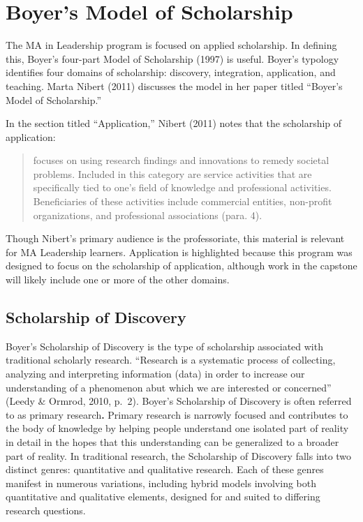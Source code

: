 \documentclass[
  letterpaper,
  DIV=11,
  numbers=noendperiod]{scrreprt}
\begin{document}
\section*{Boyer's Model of
Scholarship}\label{boyers-model-of-scholarship}


The MA in Leadership program is focused on applied scholarship. In
defining this, Boyer's four-part Model of Scholarship (1997) is useful.
Boyer's typology identifies four domains of scholarship: discovery,
integration, application, and teaching. Marta Nibert (2011) discusses
the model in her paper titled ``Boyer's Model of Scholarship.''

In the section titled ``Application,'' Nibert (2011) notes that the
scholarship of application:

\begin{quote}
focuses on using research findings and innovations to remedy societal
problems. Included in this category are service activities that are
specifically tied to one's field of knowledge and professional
activities. Beneficiaries of these activities include commercial
entities, non-profit organizations, and professional associations (para.
4).
\end{quote}

Though Nibert's primary audience is the professoriate, this material is
relevant for MA Leadership learners. Application is highlighted because
this program was designed to focus on the scholarship of application,
although work in the capstone will likely include one or more of the
other domains.

\subsection*{Scholarship of Discovery}\label{scholarship-of-discovery}

Boyer's Scholarship of Discovery is the type of scholarship associated
with traditional scholarly research. ``Research is a systematic process
of collecting, analyzing and interpreting information (data) in order to
increase our understanding of a phenomenon abut which we are interested
or concerned'' (Leedy \& Ormrod, 2010, p.~2). Boyer's Scholarship of
Discovery is often referred to as primary research\textbf{.} Primary
research is narrowly focused and contributes to the body of knowledge by
helping people understand one isolated part of reality in detail in the
hopes that this understanding can be generalized to a broader part of
reality. In traditional research, the Scholarship of Discovery falls
into two distinct genres: quantitative and qualitative research. Each of
these genres manifest in numerous variations, including hybrid models
involving both quantitative and qualitative elements, designed for and
suited to differing research questions.
\end{document}
